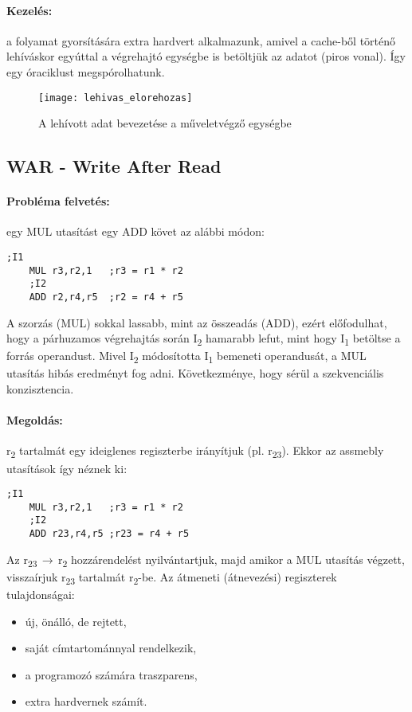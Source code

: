 \paragraph{Kezelés:} a folyamat gyorsítására extra hardvert alkalmazunk, amivel a cache-ből történő lehíváskor egyúttal a végrehajtó egységbe is betöltjük az adatot (piros vonal).
Így egy óraciklust megspórolhatunk.

\begin{figure}[H]
    \texttt{[image: lehivas\_elorehozas]}
    \centering
    \caption{A lehívott adat bevezetése a műveletvégző egységbe}
    \label{fig:lehivas_elorehozas}
\end{figure}

\subsection{WAR - Write After Read}

\paragraph{Probléma felvetés:} egy MUL utasítást egy ADD követ az alábbi módon:
\begin{lstlisting}[language=Ant]
    ;I1
    MUL r3,r2,1   ;r3 = r1 * r2
    ;I2
    ADD r2,r4,r5  ;r2 = r4 + r5
\end{lstlisting}
A szorzás (MUL) sokkal lassabb, mint az összeadás (ADD), ezért előfodulhat, hogy a párhuzamos
végrehajtás során I\textsubscript{2} hamarabb lefut, mint hogy I\textsubscript{1} betöltse a forrás operandust.
Mivel I\textsubscript{2} módosította I\textsubscript{1} bemeneti operandusát, a MUL utasítás hibás eredményt fog adni.
Következménye, hogy sérül a szekvenciális konzisztencia.
\paragraph{Megoldás:} r\textsubscript{2} tartalmát egy ideiglenes regiszterbe irányítjuk (pl. r\textsubscript{23}).
Ekkor az assmebly utasítások így néznek ki:
\begin{lstlisting}[language=Ant]
    ;I1
    MUL r3,r2,1   ;r3 = r1 * r2
    ;I2
    ADD r23,r4,r5 ;r23 = r4 + r5
\end{lstlisting}
Az r\textsubscript{23}$\,\to\,$r\textsubscript{2} hozzárendelést nyilvántartjuk, majd amikor a MUL utasítás végzett, visszaírjuk r\textsubscript{23} tartalmát r\textsubscript{2}-be.
Az átmeneti (átnevezési) regiszterek tulajdonságai:
\begin{itemize}
    \item új, önálló, de rejtett,
    \item saját címtartománnyal rendelkezik,
    \item a programozó számára traszparens,
    \item extra hardvernek számít.
\end{itemize}

